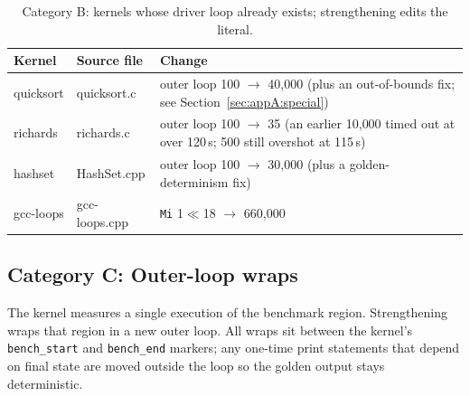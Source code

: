\begin{table}[h]
\centering
\small
\begin{tabular}{l l p{6.5cm}}
\toprule
Kernel & Source file & Change \\
\midrule
quicksort & quicksort.c & outer loop 100 $\to$ 40{,}000 (plus an out-of-bounds fix; see Section~\ref{sec:appA:special}) \\
richards  & richards.c  & outer loop 100 $\to$ 35 (an earlier 10{,}000 timed out at over 120\,s; 500 still overshot at 115\,s) \\
hashset   & HashSet.cpp & outer loop 100 $\to$ 30{,}000 (plus a golden-determinism fix) \\
gcc-loops & gcc-loops.cpp & \texttt{Mi} 1$\ll$18 $\to$ 660{,}000 \\
\bottomrule
\end{tabular}
\caption{Category B: kernels whose driver loop already exists; strengthening edits the literal.}
\end{table}

\subsection{Category C: Outer-loop wraps}

The kernel measures a single execution of the benchmark region. Strengthening wraps that region in a new outer loop. All wraps sit between the kernel's \texttt{bench\_start} and \texttt{bench\_end} markers; any one-time print statements that depend on final state are moved outside the loop so the golden output stays deterministic.

